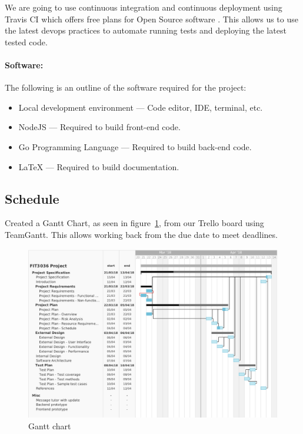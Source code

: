 \documentclass[a4paper,11pt]{article}
\begin{document}
We are going to use continuous integration and continuous deployment using
Travis CI which offers free plans for Open Source software \autocite{trci:7}. This allows us to use
the latest devops practices to automate running tests and deploying the latest
tested code.

\paragraph{Software:}

The following is an outline of the software required for the project:

\begin{itemize}
  \item Local development environment --- Code editor, IDE, terminal, etc.
  \item NodeJS --- Required to build front-end code.
  \item Go Programming Language --- Required to build back-end code.
  \item \LaTeX{} --- Required to build documentation.
\end{itemize}

\subsection{Schedule}

Created a Gantt Chart, as seen in figure~\ref{fig:gantt}, from our Trello board
\autocite{trel:15} using TeamGantt. This allows working back from the due date
to meet deadlines.

\begin{figure}[H]
  \includegraphics[width=\textwidth]{gantt-chart}
  \caption{Gantt chart}\label{fig:gantt}
\end{figure}
\end{document}
